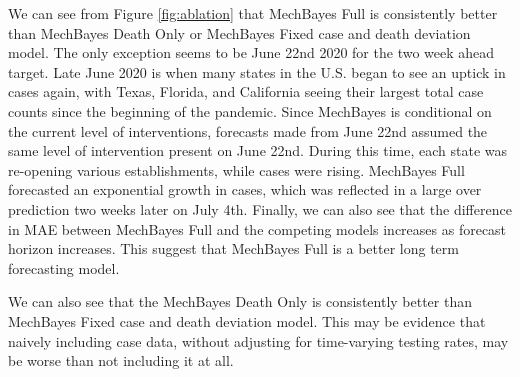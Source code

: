 \documentclass[11pt]{amsart}
\begin{document}
We can see from Figure \ref{fig:ablation} that MechBayes Full is consistently better than MechBayes Death Only or MechBayes Fixed case and death deviation model. The only exception seems to be June 22nd 2020 for the two week ahead target. Late June 2020 is when many states in the U.S. began to see an uptick in cases again, with Texas, Florida, and California seeing their largest total case counts since the beginning of the pandemic. Since MechBayes is conditional on the current level of interventions, forecasts made from June 22nd assumed the same level of intervention present on June 22nd. During this time, each state was re-opening various establishments, while cases were rising. MechBayes Full forecasted an exponential growth in cases, which was reflected in a large over prediction two weeks later on July 4th. Finally, we can also see that the difference in MAE between MechBayes Full and the competing models increases as forecast horizon increases. This suggest that MechBayes Full is a better long term forecasting model.

We can also see that the MechBayes Death Only is consistently better than MechBayes Fixed case and death deviation model.  This may be evidence that naively including case data, without adjusting for time-varying testing rates, may be worse than not including it at all. 
\end{document}
